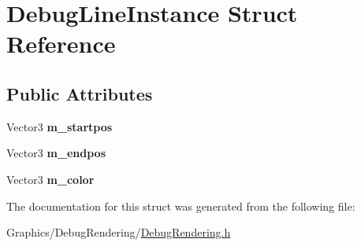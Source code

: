 \hypertarget{structDebugLineInstance}{}\section{Debug\+Line\+Instance Struct Reference}
\label{structDebugLineInstance}
\subsection*{Public Attributes}
\begin{DoxyCompactItemize}
\item 
\mbox{\label{structDebugLineInstance_aa1732db51793115864aa41688840c358}} 
Vector3 {\bfseries m\+\_\+startpos}
\item 
\mbox{\label{structDebugLineInstance_a41c27823edb10afec6f616a57adcf562}} 
Vector3 {\bfseries m\+\_\+endpos}
\item 
\mbox{\label{structDebugLineInstance_ad361db9b353f1faf16b0b5a197431535}} 
Vector3 {\bfseries m\+\_\+color}
\end{DoxyCompactItemize}


The documentation for this struct was generated from the following file\+:\begin{DoxyCompactItemize}
\item 
Graphics/\+Debug\+Rendering/\hyperlink{DebugRendering_8h}{Debug\+Rendering.\+h}\end{DoxyCompactItemize}
